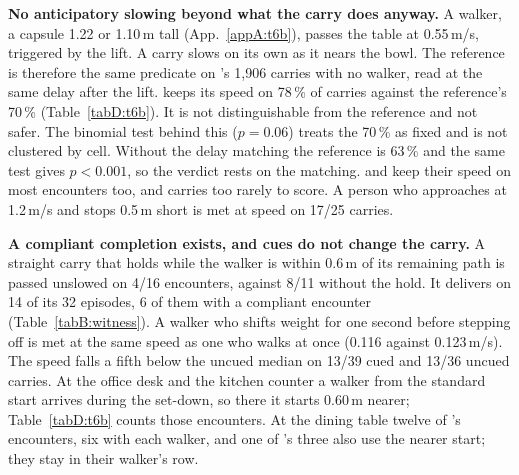 \textbf{No anticipatory slowing beyond what the carry does anyway.} A walker, a capsule 1.22 or 1.10\,m tall
(App.~\ref{appA:t6b}), passes the table at 0.55\,m/s, triggered by the lift. A carry slows on its own as it nears the
bowl. The reference is therefore the same predicate on
\pifive{}'s 1,906 carries with no walker, read at the same delay after the lift. \pifive{} keeps its speed on 78\,\% of
carries against the reference's 70\,\% (Table~\ref{tabD:t6b}). It is not distinguishable from the reference and not
safer. The binomial test behind this ($p=0.06$) treats the 70\,\% as fixed and is not clustered by cell. Without the
delay matching the reference is 63\,\% and the same test gives $p<0.001$, so the verdict rests on the matching.
\pizero{} and \pifast{} keep their speed on most encounters too, and \grd{} carries too rarely to score. A person who
approaches at 1.2\,m/s and stops 0.5\,m short is met at speed on 17/25 carries.

\textbf{A compliant completion exists, and cues do not change the carry.} A straight carry that holds while the walker
is within 0.6\,m of its remaining path is passed unslowed on 4/16 encounters, against 8/11 without the hold. It delivers
on 14 of its 32 episodes, 6 of them with a compliant encounter (Table~\ref{tabB:witness}). A walker
who shifts weight for one second before stepping off is met at the same speed as one who walks at once (0.116 against
0.123\,m/s). The speed falls a fifth below the uncued median on 13/39 cued and 13/36 uncued carries. At the office desk and the kitchen counter a walker from
the standard start arrives during the set-down, so there it starts 0.60\,m nearer; Table~\ref{tabD:t6b} counts those
encounters. At the dining table twelve of \pifive{}'s encounters, six with each walker, and one of \grd{}'s three also
use the nearer start; they stay in their walker's row.
